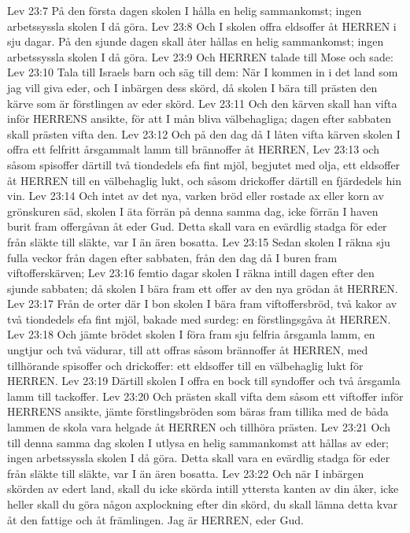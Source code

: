 Lev 23:7  På den första dagen skolen I hålla en helig sammankomst; ingen arbetssyssla skolen I då göra.
Lev 23:8  Och I skolen offra eldsoffer åt HERREN i sju dagar. På den sjunde dagen skall åter hållas en helig sammankomst; ingen arbetssyssla skolen I då göra.
Lev 23:9  Och HERREN talade till Mose och sade:
Lev 23:10  Tala till Israels barn och säg till dem: När I kommen in i det land som jag vill giva eder, och I inbärgen dess skörd, då skolen I bära till prästen den kärve som är förstlingen av eder skörd.
Lev 23:11  Och den kärven skall han vifta inför HERRENS ansikte, för att I mån bliva välbehagliga; dagen efter sabbaten skall prästen vifta den.
Lev 23:12  Och på den dag då I låten vifta kärven skolen I offra ett felfritt årsgammalt lamm till brännoffer åt HERREN,
Lev 23:13  och såsom spisoffer därtill två tiondedels efa fint mjöl, begjutet med olja, ett eldsoffer åt HERREN till en välbehaglig lukt, och såsom drickoffer därtill en fjärdedels hin vin.
Lev 23:14  Och intet av det nya, varken bröd eller rostade ax eller korn av grönskuren säd, skolen I äta förrän på denna samma dag, icke förrän I haven burit fram offergåvan åt eder Gud. Detta skall vara en evärdlig stadga för eder från släkte till släkte, var I än ären bosatta.
Lev 23:15  Sedan skolen I räkna sju fulla veckor från dagen efter sabbaten, från den dag då I buren fram viftofferskärven;
Lev 23:16  femtio dagar skolen I räkna intill dagen efter den sjunde sabbaten; då skolen I bära fram ett offer av den nya grödan åt HERREN.
Lev 23:17  Från de orter där I bon skolen I bära fram viftoffersbröd, två kakor av två tiondedels efa fint mjöl, bakade med surdeg: en förstlingsgåva åt HERREN.
Lev 23:18  Och jämte brödet skolen I föra fram sju felfria årsgamla lamm, en ungtjur och två vädurar, till att offras såsom brännoffer åt HERREN, med tillhörande spisoffer och drickoffer: ett eldsoffer till en välbehaglig lukt för HERREN.
Lev 23:19  Därtill skolen I offra en bock till syndoffer och två årsgamla lamm till tackoffer.
Lev 23:20  Och prästen skall vifta dem såsom ett viftoffer inför HERRENS ansikte, jämte förstlingsbröden som bäras fram tillika med de båda lammen de skola vara helgade åt HERREN och tillhöra prästen.
Lev 23:21  Och till denna samma dag skolen I utlysa en helig sammankomst att hållas av eder; ingen arbetssyssla skolen I då göra. Detta skall vara en evärdlig stadga för eder från släkte till släkte, var I än ären bosatta.
Lev 23:22  Och när I inbärgen skörden av edert land, skall du icke skörda intill yttersta kanten av din åker, icke heller skall du göra någon axplockning efter din skörd, du skall lämna detta kvar åt den fattige och åt främlingen. Jag är HERREN, eder Gud.
